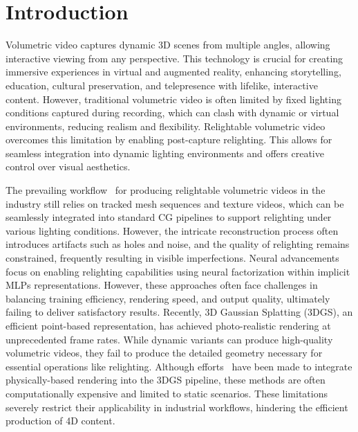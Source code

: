 \section{Introduction}
Volumetric video captures dynamic 3D scenes from multiple angles, allowing interactive viewing from any perspective. 
This technology is crucial for creating immersive experiences in virtual and augmented reality, enhancing storytelling, education, cultural preservation, and telepresence with lifelike, interactive content. However, traditional volumetric video is often limited by fixed lighting conditions captured during recording, which can clash with dynamic or virtual environments, reducing realism and flexibility. Relightable volumetric video overcomes this limitation by enabling post-capture relighting. This allows for seamless integration into dynamic lighting environments and offers creative control over visual aesthetics.

The prevailing workflow~\cite{collet2015high, dou2016fusion4d, lawrence2024project, garon2016real} for producing relightable volumetric videos in the industry still relies on tracked mesh sequences and texture videos, which can be seamlessly integrated into standard CG pipelines to support relighting under various lighting conditions. However, the intricate reconstruction process often introduces artifacts such as holes and noise, and the quality of relighting remains constrained, frequently resulting in visible imperfections.
Neural advancements~\cite{srinivasan2021nerv, zhang2021nerfactor, yao2022neilf} focus on enabling relighting capabilities using neural factorization within implicit MLPs representations. However, these approaches often face challenges in balancing training efficiency, rendering speed, and output quality, ultimately failing to deliver satisfactory results.
Recently, 3D Gaussian Splatting (3DGS)\cite{gaussiansplatting}, an efficient point-based representation, has achieved photo-realistic rendering at unprecedented frame rates. While dynamic variants\cite{jiang2024robust, li2023spacetime, vcube} can produce high-quality volumetric videos, they fail to produce the detailed geometry necessary for essential operations like relighting.
Although efforts~\cite{gao2025relightable, shi2023gir, liang2024gs, jiang2024gaussianshader} have been made to integrate physically-based rendering into the 3DGS pipeline, these methods are often computationally expensive and limited to static scenarios. These limitations severely restrict their applicability in industrial workflows, hindering the efficient production of 4D content.



